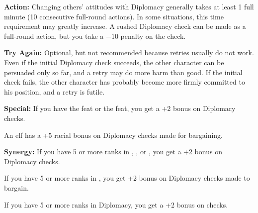 \textbf{Action:} Changing others' attitudes with Diplomacy generally takes at least 1 full minute (10 consecutive full-round actions). In some situations, this time requirement may greatly increase. A rushed Diplomacy check can be made as a full-round action, but you take a $-10$ penalty on the check.

\textbf{Try Again:} Optional, but not recommended because retries usually do not work. Even if the initial Diplomacy check succeeds, the other character can be persuaded only so far, and a retry may do more harm than good. If the initial check fails, the other character has probably become more firmly committed to his position, and a retry is futile.

\textbf{Special:} If you have the  feat or the  feat, you get a +2 bonus on Diplomacy checks.

An elf has a +5 racial bonus on Diplomacy checks made for bargaining.

\textbf{Synergy:} If you have 5 or more ranks in , , or , you get a +2 bonus on Diplomacy checks.

If you have 5 or more ranks in , you get +2 bonus on Diplomacy checks made to bargain.

If you have 5 or more ranks in Diplomacy, you get a +2 bonus on  checks.